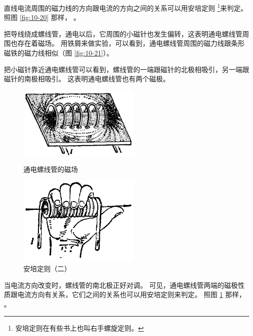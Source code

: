 直线电流周围的磁力线的方向跟电流的方向之间的关系可以用安培定则
\footnote{安培定则在有些书上也叫右手螺旋定则。}来判定。照图 \ref{fig:10-20} 那样，
。

把导线绕成螺线管，通电以后，它周围的小磁针也发生偏转，这表明通电螺线管周围也存在着磁场。
用铁屑来做实验，可以看到，通电螺线管周围的磁力线跟条形磁铁的磁力线相似（图 \ref{fig:10-21}）。

把小磁针靠近通电螺线管可以看到，螺线管的一端跟磁针的北极相吸引，另一端跟磁针的南极相吸引。
这表明通电螺线管也有两个磁极。


\begin{figure}[htbp]
    \centering
    \begin{minipage}{7cm}
    \centering
    \includegraphics[width=6cm]{../pic/czwl2-ch10-21}
    \caption{通电螺线管的磁场}\label{fig:10-21}
    \end{minipage}
    \qquad
    \begin{minipage}{7cm}
    \centering
    \includegraphics[width=6cm]{../pic/czwl2-ch10-22}
    \caption{安培定则（二）}\label{fig:10-22}
    \end{minipage}
\end{figure}

当电流方向改变时，螺线管的南北极正好对调。
可见，通电螺线管两端的磁极性质跟电流方向有关系，它们之间的关系也可以用安培定则来判定。
照图 \ref{fig:10-22} 那样，
。


\newpage

\lianxi


